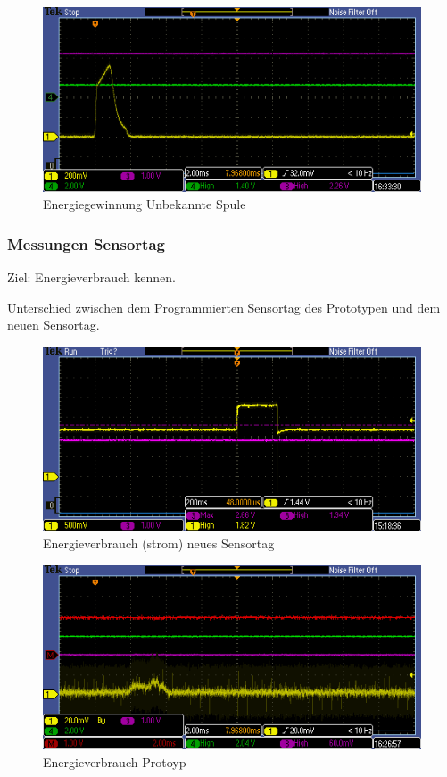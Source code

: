 \begin{figure}[h]
\includegraphics[bb=0 150 50 50]{EMBoardAusgang100Ohm.PNG}
\caption{Energiegewinnung Unbekannte Spule}
\end{figure}



\pagebreak
\subsubsection{Messungen Sensortag}
Ziel: Energieverbrauch kennen.

Unterschied zwischen dem Programmierten Sensortag des Prototypen und dem neuen Sensortag.

\begin{figure}[h]
\includegraphics[bb=0 300 50 50]{SensortagRuhestrom.PNG}
\caption{Energieverbrauch (strom) neues Sensortag}
\end{figure}

\begin{figure}[h]
\includegraphics[bb=0 550 50 50]{NeuesSensortagSTromverbrauch.PNG}
\caption{Energieverbrauch Protoyp}
\end{figure}

